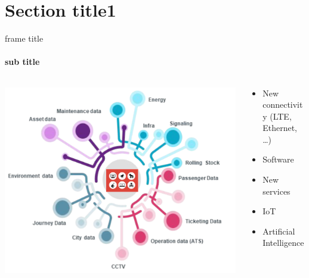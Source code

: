\section{Section title1}
\begin{frame}[fragile]{frame title}
	\framesubtitle{sub title}%
	\begin{columns}[T]
		\begin{column}{.45\textwidth}
				\includegraphics[scale=.17]{gfx/mobilitydata.png}%
		\end{column}
	
		\begin{column}{.45\textwidth}
			\vspace{3em}
				\begin{itemize}
				\item New connectivity (LTE, Ethernet, \ldots)
				\item Software
				\item New services
				\item IoT
				\item Artificial Intelligence
			\end{itemize}			
		\end{column}	
	\end{columns}
\end{frame}

